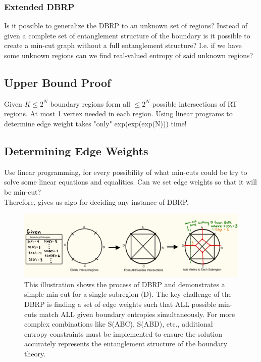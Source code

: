 \documentclass[12pt]{article}
\begin{document}
\subsubsection{Extended DBRP}
\hspace{0.5cm} Is it possible to generalize the DBRP to an unknown set of regions? Instead of given a complete set of entanglement structure of the boundary is it possible to create a min-cut graph without a full entanglement structure? I.e. if we have some unknown regions can we find real-valued entropy of said unknown regions?


\subsection{Upper Bound Proof}
Given $K\leq2^N$ boundary regions form all $\leq2^N$ possible intersections of RT regions. At most 1 vertex needed in each region. Using linear programs to determine edge weight takes "only" exp(exp(exp(N))) time!

\subsection{Determining Edge Weights}
Use linear programming, for every possibility of what min-cuts could be try to solve some linear equations and equalities. Can we set edge weights so that it will be min-cut?
\\Therefore, gives us algo for deciding any instance of DBRP.

\begin{figure}[htbp]  %
    \centering
    \includegraphics[width=\textwidth]{vertex_subregions.jpeg}  %
    \caption{This illustration shows the process of DBRP and demonstrates a simple min-cut for a single subregion (D). The key challenge of the DBRP is finding a set of edge weights such that ALL possible min-cuts match ALL given boundary entropies simultaneously. For more complex combinations like S(ABC), S(ABD), etc., additional entropy constraints must be implemented to ensure the solution accurately represents the entanglement structure of the boundary theory.}  %
    \label{fig:single subregion min-cut}  %
\end{figure}
\newpage 
\end{document}
